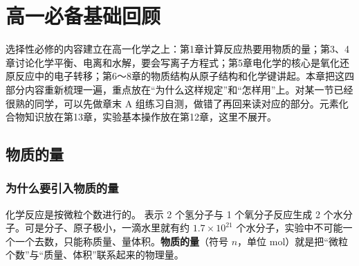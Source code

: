 \newcommand{\czeroSide}[4]{%
  \ifcase#1\relax
  \or \fill (#2,#3) circle (0.028);
  \or \if#4h\fill ({#2-0.065},#3) circle (0.028) ({#2+0.065},#3) circle (0.028);%
      \else\fill (#2,{#3-0.065}) circle (0.028) (#2,{#3+0.065}) circle (0.028);\fi
  \or \node[inner sep=0pt,font=\scriptsize] at (#2,#3) {$\times$};
  \fi}
\newcommand{\czeroAt}[7]{%
  \node[inner sep=0pt] at (#1,#2) {#3};
  \czeroSide{#4}{#1}{#2+0.25}{h}\czeroSide{#5}{#1+0.28}{#2}{v}%
  \czeroSide{#6}{#1}{#2-0.25}{h}\czeroSide{#7}{#1-0.28}{#2}{v}}
\newcommand{\czeroBr}[3]{%
  \draw (#1+0.07,0.38)--(#1,0.38)--(#1,-0.38)--(#1+0.07,-0.38);
  \draw (#2-0.07,0.38)--(#2,0.38)--(#2,-0.38)--(#2-0.07,-0.38);
  \node[anchor=west,inner sep=1pt,font=\scriptsize] at (#2,0.42) {#3};}

\chapter{高一必备基础回顾}

选择性必修的内容建立在高一化学之上：第1章计算反应热要用物质的量；第3、4章讨论化学平衡、电离和水解，要会写离子方程式；第5章电化学的核心是氧化还原反应中的电子转移；第6～8章的物质结构从原子结构和化学键讲起。本章把这四部分内容重新梳理一遍，重点放在“为什么这样规定”和“怎样用”上。对某一节已经很熟的同学，可以先做章末 A 组练习自测，做错了再回来读对应的部分。元素化合物知识放在第13章，实验基本操作放在第12章，这里不展开。

\section{物质的量}

\subsection{为什么要引入物质的量}
化学反应是按微粒个数进行的。 表示 2 个氢分子与 1 个氧分子反应生成 2 个水分子。可是分子、原子极小，一滴水里就有约 $1.7\times10^{21}$ 个水分子，实验中不可能一个一个去数，只能称质量、量体积。\textbf{物质的量}（符号 $n$，单位 mol）就是把“微粒个数”与“质量、体积”联系起来的物理量。

